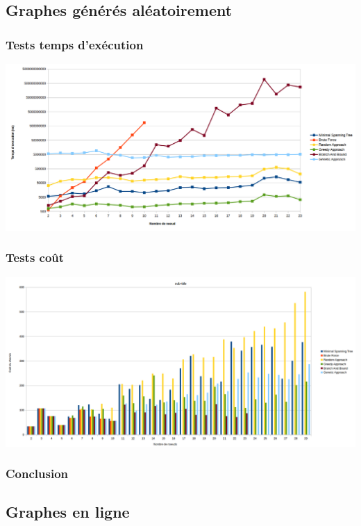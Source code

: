 \documentclass[10pt,a4paper]{report}
\begin{document}
	\subsection{Graphes générés aléatoirement}
		\subsubsection{Tests temps d'exécution}
			\includegraphics[scale=0.45]{./Ressource/temps_graphes_random.png}	
		
		\subsubsection{Tests coût}
			
			\includegraphics[scale=0.40]{./Ressource/cout_graphes_random.png}
			
		\subsubsection{Conclusion}
			
	\subsection{Graphes en ligne}
\end{document}
